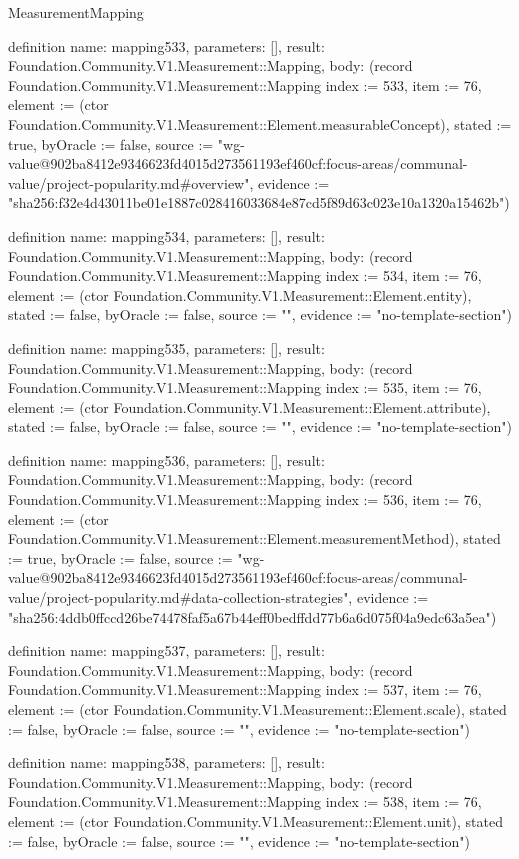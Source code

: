 \begin{lexlean}{MeasurementMapping}
\begin{semanticmodule}
definition{
  name: mapping533,
  parameters: [],
  result: Foundation.Community.V1.Measurement::Mapping,
  body: (record Foundation.Community.V1.Measurement::Mapping {index := 533, item := 76, element := (ctor Foundation.Community.V1.Measurement::Element.measurableConcept), stated := true, byOracle := false, source := "wg-value@902ba8412e9346623fd4015d273561193ef460cf:focus-areas/communal-value/project-popularity.md#overview", evidence := "sha256:f32e4d43011be01e1887c028416033684e87cd5f89d63c023e10a1320a15462b"})
}

definition{
  name: mapping534,
  parameters: [],
  result: Foundation.Community.V1.Measurement::Mapping,
  body: (record Foundation.Community.V1.Measurement::Mapping {index := 534, item := 76, element := (ctor Foundation.Community.V1.Measurement::Element.entity), stated := false, byOracle := false, source := "", evidence := "no-template-section"})
}

definition{
  name: mapping535,
  parameters: [],
  result: Foundation.Community.V1.Measurement::Mapping,
  body: (record Foundation.Community.V1.Measurement::Mapping {index := 535, item := 76, element := (ctor Foundation.Community.V1.Measurement::Element.attribute), stated := false, byOracle := false, source := "", evidence := "no-template-section"})
}

definition{
  name: mapping536,
  parameters: [],
  result: Foundation.Community.V1.Measurement::Mapping,
  body: (record Foundation.Community.V1.Measurement::Mapping {index := 536, item := 76, element := (ctor Foundation.Community.V1.Measurement::Element.measurementMethod), stated := true, byOracle := false, source := "wg-value@902ba8412e9346623fd4015d273561193ef460cf:focus-areas/communal-value/project-popularity.md#data-collection-strategies", evidence := "sha256:4ddb0ffccd26be74478faf5a67b44eff0bedffdd77b6a6d075f04a9edc63a5ea"})
}

definition{
  name: mapping537,
  parameters: [],
  result: Foundation.Community.V1.Measurement::Mapping,
  body: (record Foundation.Community.V1.Measurement::Mapping {index := 537, item := 76, element := (ctor Foundation.Community.V1.Measurement::Element.scale), stated := false, byOracle := false, source := "", evidence := "no-template-section"})
}

definition{
  name: mapping538,
  parameters: [],
  result: Foundation.Community.V1.Measurement::Mapping,
  body: (record Foundation.Community.V1.Measurement::Mapping {index := 538, item := 76, element := (ctor Foundation.Community.V1.Measurement::Element.unit), stated := false, byOracle := false, source := "", evidence := "no-template-section"})
}


\end{semanticmodule}
\end{lexlean}
